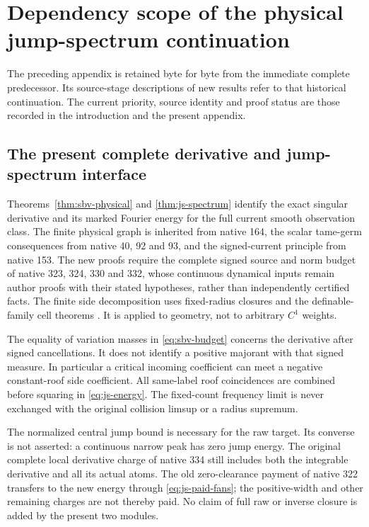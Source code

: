 \section{Dependency scope of the physical jump-spectrum continuation}
\label{sec:current-jump-dependencies}
The preceding appendix is retained byte for byte from the immediate
complete predecessor. Its source-stage descriptions of new results
refer to that historical continuation. The current priority, source
identity and proof status are those recorded in the introduction
and the present appendix.

\subsection*{The present complete derivative and jump-spectrum interface}
Theorems~\ref{thm:sbv-physical} and \ref{thm:js-spectrum}
identify the exact singular derivative and its marked Fourier
energy for the full current smooth observation class.
The finite physical graph is inherited from native 164,
the scalar tame-germ consequences from native 40, 92 and 93,
and the signed-current principle from native 153. The
new proofs require the complete signed source and norm
budget of native 323, 324, 330 and 332, whose continuous
dynamical inputs remain author proofs with their stated
hypotheses, rather than independently certified facts.
The finite side decomposition uses fixed-radius
closures and the definable-family cell theorems
\cite[Theorems 2.9--2.10 and 6.6--6.7]{CosteOM}.
It is applied to geometry, not to arbitrary $C^1$ weights.

The equality of variation masses in
\eqref{eq:sbv-budget} concerns the derivative after signed
cancellations. It does not identify a positive majorant
with that signed measure. In particular a critical
incoming coefficient can meet a negative constant-roof
side coefficient. All same-label roof coincidences are
combined before squaring in \eqref{eq:js-energy}.
The fixed-count frequency limit is never exchanged
with the original collision limsup or a radius supremum.

The normalized central jump bound is necessary for the
raw target. Its converse is not asserted: a continuous
narrow peak has zero jump energy. The original complete
local derivative charge of native 334 still includes
both the integrable derivative and all its actual atoms.
The old zero-clearance payment of native 322 transfers
to the new energy through \eqref{eq:js-paid-fans};
the positive-width and other remaining charges are
not thereby paid. No claim of full raw or inverse
closure is added by the present two modules.
